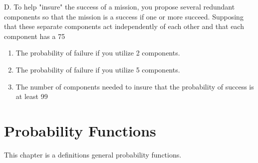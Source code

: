 \documentclass[10pt,]{book}
\theoremstyle{plain}
\theoremstyle{definition}
\theoremstyle{definition}
\theoremstyle{definition}
\numberwithin{equation}{section}
\begin{document}
\par

	D.  To help "insure" the success of a mission, you propose several redundant components so that the mission is a success if one or more succeed. Supposing that these separate components act independently of each other and that each component has a 75%
	\leavevmode%
\begin{enumerate}
\item\hypertarget{li-147}{}The probability of failure if you utilize 2 components.%
\item\hypertarget{li-148}{}The probability of failure if you utilize 5 components.%
\item\hypertarget{li-149}{}The number of components needed to insure that the probability of success is at least 99%
\end{enumerate}

\typeout{************************************************}
\typeout{************************************************}
\chapter[Probability Functions]{Probability Functions}\label{ProbabilityFunctions}
\typeout{************************************************}
\typeout{************************************************}
This chapter is a definitions general probability functions.%
\typeout{************************************************}
\typeout{************************************************}
\end{document}

